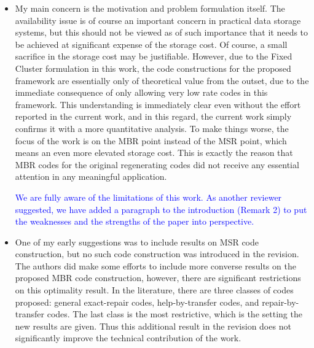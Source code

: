 \documentclass{article}
\begin{document}
\begin{itemize}

\item My main concern is the motivation and problem formulation itself. The availability issue is of course an important concern in practical data storage systems, but this should not be viewed as of such importance that it needs to be achieved at significant expense of the storage cost. Of course, a small sacrifice in the storage cost may be justifiable. However, due to the Fixed Cluster formulation in this work, the code constructions for the proposed framework are essentially only of theoretical value from the outset, due to the immediate consequence of only allowing very low rate codes in this framework. This understanding is immediately clear even without the effort reported in the current work, and in this regard, the current work simply confirms it with a more quantitative analysis. To make things worse, the focus of the work is on the MBR point instead of the MSR point, which means an even more elevated storage cost. This is exactly the reason that MBR codes for the original regenerating codes
did not receive any essential attention in any meaningful application.

\textcolor{blue}{We are fully aware of the limitations of this work. As another reviewer suggested, we have added a paragraph to the introduction (Remark 2) to put the weaknesses and the strengths of the paper into perspective.}


\item One of my early suggestions was to include results on MSR code construction, but no such code construction was introduced in the revision. The authors did make some efforts to include more converse results on the proposed MBR code construction, however, there are significant restrictions on this optimality result. In the literature, there are three classes of
codes proposed: general exact-repair codes, help-by-transfer codes, and repair-by-transfer codes. The last class is the most restrictive, which is the setting the new results are given. Thus this additional result in the revision does not significantly improve the technical contribution of the work.


\end{itemize}
\end{document}
